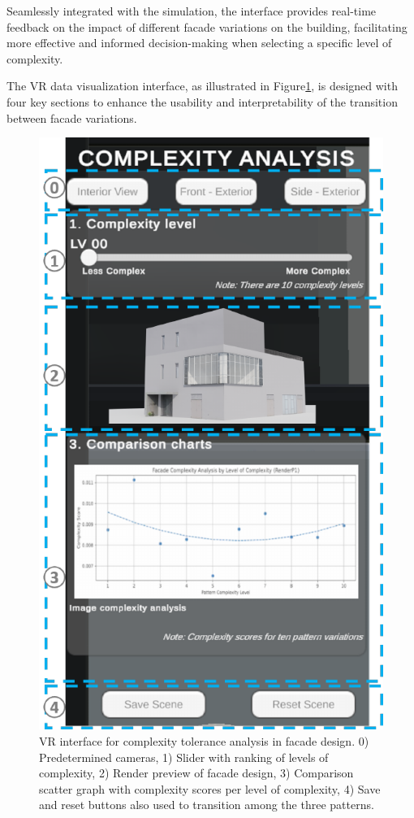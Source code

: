 Seamlessly integrated with the simulation, the interface provides real-time feedback on the impact of different facade variations on the building, facilitating more effective and informed decision-making when selecting a specific level of complexity.


The VR data visualization interface, as illustrated in Figure\ref{fig:VRInterface}, is designed with four key sections to enhance the usability and interpretability of the transition between facade variations.

     \begin{figure}[!htb]
          \centering
          \includegraphics[width= \linewidth]{Images/VRInterface}
          \caption{VR interface for complexity tolerance analysis in facade design. 0) Predetermined cameras, 1) Slider with ranking of levels of complexity, 2) Render preview of facade design, 3) Comparison scatter graph with complexity scores per level of complexity, 4) Save and reset buttons also used to transition among the three patterns.}
          \label{fig:VRInterface}
        \end{figure}

